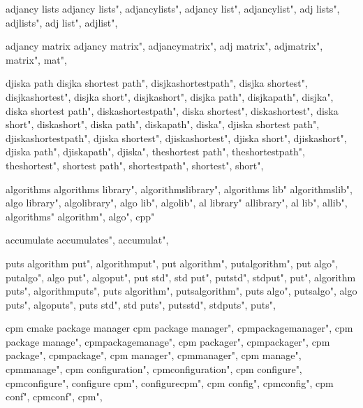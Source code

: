          adjancy lists
        adjancy lists",  
        adjancylists",  
        adjancy list",  
        adjancylist",  
        adj lists",  
        adjlists",  
        adj list",  
        adjlist",  
        
         adjancy matrix 
        adjancy matrix",  
        adjancymatrix",  
        adj matrix",  
        adjmatrix",  
        matrix",  
        mat",  
        
         djiska path 
        disjka shortest path",  
        disjkashortestpath",  
        disjka shortest",  
        disjkashortest",  
        disjka short",  
        disjkashort",  
        disjka path",  
        disjkapath",  
        disjka",  
        diska shortest path",  
        diskashortestpath",  
        diska shortest",  
        diskashortest",  
        diska short",  
        diskashort",  
        diska path",  
        diskapath",  
        diska",  
        djiska shortest path",  
        djiskashortestpath",  
        djiska shortest",  
        djiskashortest",  
        djiska short",  
        djiskashort",  
        djiska path",  
        djiskapath",  
        djiska",  
        theshortest path",  
        theshortestpath",  
        theshortest",  
        shortest path",  
        shortestpath",  
        shortest",  
        short",  
        
         algorithms 
        algorithms library",
        algorithmslibrary", 
        algorithms lib"
        algorithmslib",
        algo library", 
        algolibrary",
        algo lib", 
        algolib",
        al library"
        allibrary",
        al lib",
        allib",
        algorithms"
        algorithm",
        algo", cpp"
        
         accumulate
        accumulates",  
        accumulat",  
        
         puts 
        algorithm put",  
        algorithmput",  
        put algorithm",  
        putalgorithm",  
        put algo",  
        putalgo",  
        algo put",  
        algoput",  
        put std",  
        std put",  
        putstd",  
        stdput",  
        put",  
        algorithm puts",  
        algorithmputs",  
        puts algorithm",  
        putsalgorithm",  
        puts algo",  
        putsalgo",  
        algo puts",  
        algoputs",  
        puts std",  
        std puts",  
        putsstd",  
        stdputs",  
        puts",  
        
         cpm cmake package manager
        cpm package manager",  
        cpmpackagemanager",  
        cpm package manage",  
        cpmpackagemanage",  
        cpm packager",  
        cpmpackager",  
        cpm package",  
        cpmpackage",  
        cpm manager",  
        cpmmanager",  
        cpm manage",  
        cpmmanage",  
        cpm configuration",  
        cpmconfiguration",  
        cpm configure",  
        cpmconfigure",  
        configure cpm",  
        configurecpm",  
        cpm config",  
        cpmconfig",  
        cpm conf",  
        cpmconf",  
        cpm",  
        
